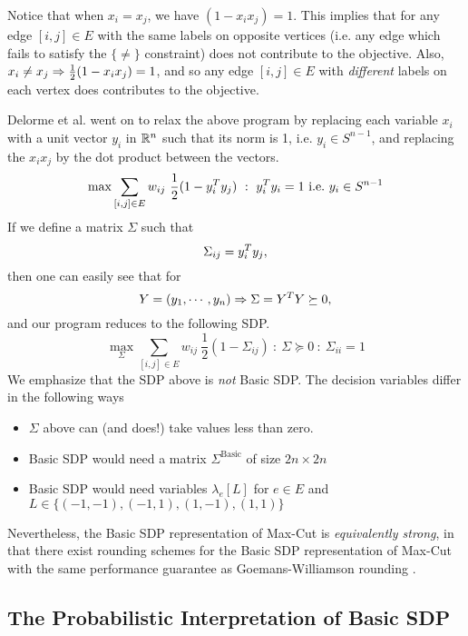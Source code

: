 Notice that when $x_i=x_j$, we have $(1-x_{i}x_{j})=1$. This implies that for any edge $[i,j] \in E$ with  the same labels on opposite vertices (i.e. any edge which fails to satisfy the $\{\neq\}$ constraint) does not contribute to the objective. Also, $x_i \neq x_j \Rightarrow \frac{1}{2}(1-x_{i}x_{j}) = 1$, and so any edge $[i,j] \in E$ with \textit{different} labels on each vertex does contributes to the objective.

Delorme et al. went on to relax the above program by replacing each variable $x_i$ with a unit vector $y_i$ in $\mathbb{R}^n$ such that its norm is 1, i.e. $y_i \in S^{n-1}$, and replacing the $x_ix_j$ by the dot product between the vectors. 
\[ \max \sum_{[i,j] \in E} w_{ij} \ \frac{1}{2}(1-y_i\trans y_j) ~:~ y_i\trans y_i = 1 {\mbox {\ i.e.\ }} y_i \in S^{n-1} \]
If we define a matrix $\Sigma$ such that $$\Sigma_{ij} = y_i^T y_j,$$ then one can easily see that for $$Y = (y_1, \cdots, y_n) \Rightarrow \Sigma = Y^T Y \succeq 0,$$ and our program reduces to the following SDP.
\[ \max_\Sigma \sum_{[i,j] \in E} w_{ij} \ \frac{1}{2}(1-\Sigma_{ij}) ~:~ \Sigma \succeq 0 ~:~ \Sigma_{ii} = 1  \]
We emphasize that the SDP above is \textit{not} Basic SDP. The decision variables differ in the following ways
\begin{itemize}
\item $\Sigma$ above can (and does!) take values less than zero.
\item Basic SDP would need a matrix $\Sigma^{\text{Basic}}$ of size $2 n \times 2 n$
\item Basic SDP would need variables $\lambda_e[L]$ for $e \in E$ and $L \in\{(-1,-1),(-1,1),(1,-1),(1,1)\}$
\end{itemize}
Nevertheless, the Basic SDP representation of Max-Cut is \textit{equivalently strong}, in that there exist rounding schemes for the Basic SDP representation of Max-Cut with the same performance guarantee as Goemans-Williamson rounding \cite{Rag08}.


\subsection{The Probabilistic Interpretation of Basic SDP}

